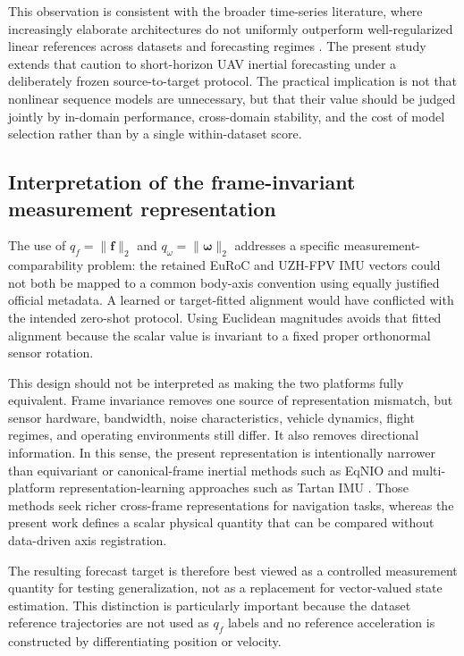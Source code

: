 \documentclass[preprint,12pt]{elsarticle}
\newcommand{\qf}{q_f}
\newcommand{\qw}{q_\omega}
\newcommand{\vect}[1]{\boldsymbol{#1}}
\begin{document}
This observation is consistent with the broader time-series literature, where increasingly elaborate architectures do not uniformly outperform well-regularized linear references across datasets and forecasting regimes \cite{Zeng2023Transformers,Qiu2024TFB}. The present study extends that caution to short-horizon UAV inertial forecasting under a deliberately frozen source-to-target protocol. The practical implication is not that nonlinear sequence models are unnecessary, but that their value should be judged jointly by in-domain performance, cross-domain stability, and the cost of model selection rather than by a single within-dataset score.

\subsection{Interpretation of the frame-invariant measurement representation}

The use of $\qf=\|\vect{f}\|_2$ and $\qw=\|\vect{\omega}\|_2$ addresses a specific measurement-comparability problem: the retained EuRoC and UZH-FPV IMU vectors could not both be mapped to a common body-axis convention using equally justified official metadata. A learned or target-fitted alignment would have conflicted with the intended zero-shot protocol. Using Euclidean magnitudes avoids that fitted alignment because the scalar value is invariant to a fixed proper orthonormal sensor rotation.

This design should not be interpreted as making the two platforms fully equivalent. Frame invariance removes one source of representation mismatch, but sensor hardware, bandwidth, noise characteristics, vehicle dynamics, flight regimes, and operating environments still differ. It also removes directional information. In this sense, the present representation is intentionally narrower than equivariant or canonical-frame inertial methods such as EqNIO and multi-platform representation-learning approaches such as Tartan IMU \cite{Jayanth2025EqNIO,Zhao2025TartanIMU}. Those methods seek richer cross-frame representations for navigation tasks, whereas the present work defines a scalar physical quantity that can be compared without data-driven axis registration.

The resulting forecast target is therefore best viewed as a controlled measurement quantity for testing generalization, not as a replacement for vector-valued state estimation. This distinction is particularly important because the dataset reference trajectories are not used as $\qf$ labels and no reference acceleration is constructed by differentiating position or velocity.
\end{document}
